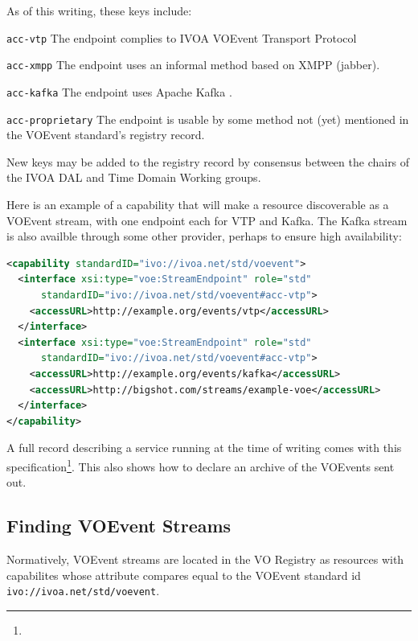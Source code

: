 \documentclass[11pt,a4paper]{ivoa}
\begin{document}
As of this writing, these keys include:

\begin{compactitem}
\item  \verb|acc-vtp| The endpoint complies to IVOA VOEvent Transport
  Protocol \citep{2017ivoa.spec.0320S}
\item \verb|acc-xmpp| The endpoint uses an informal method based on
    	XMPP (jabber).
\item \verb|acc-kafka| The endpoint uses Apache Kafka \citep{kafkaEcosystem}.
\item \verb|acc-proprietary| The endpoint is usable by some
  method not (yet) mentioned in the VOEvent standard's registry record.
\end{compactitem}

New keys may be added to the registry record by consensus between the
chairs of the IVOA DAL and Time Domain Working groups.

Here is an example of a capability that will make a resource
discoverable as a VOEvent stream, with one endpoint each for VTP and
Kafka.  The Kafka stream is also availble through some other
provider, perhaps to ensure high availability:

\begin{lstlisting}[language=XML]
<capability standardID="ivo://ivoa.net/std/voevent">
  <interface xsi:type="voe:StreamEndpoint" role="std"
      standardID="ivo://ivoa.net/std/voevent#acc-vtp">
    <accessURL>http://example.org/events/vtp</accessURL>
  </interface>
  <interface xsi:type="voe:StreamEndpoint" role="std"
      standardID="ivo://ivoa.net/std/voevent#acc-vtp">
    <accessURL>http://example.org/events/kafka</accessURL>
    <accessURL>http://bigshot.com/streams/example-voe</accessURL>
  </interface>
</capability>
\end{lstlisting}

A full record describing a service running at the time of writing
comes with this
specification\footnote{}.  This also
shows how to declare an archive of the VOEvents sent out.

\subsection{Finding VOEvent Streams}

Normatively, VOEvent streams are located in the VO Registry as resources
with capabilites whose  attribute compares equal to
the VOEvent standard id \nolinkurl{ivo://ivoa.net/std/voevent}.
\end{document}
